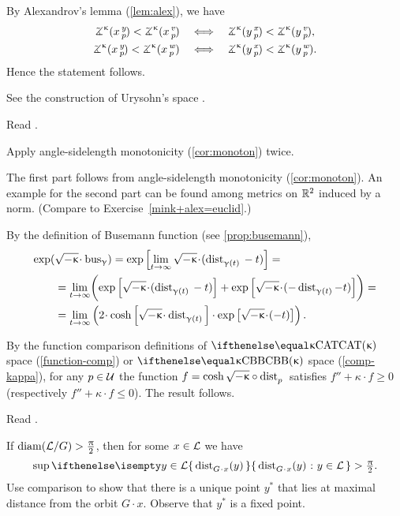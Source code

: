 By Alexandrov's lemma (\ref{lem:alex}), we have
\begin{align*}
\angk\kappa xyp<\angk\kappa xvp
\quad&\Longleftrightarrow\quad
\angk\kappa yxp<\angk\kappa yvp,
\\
\angk\kappa xyp<\angk\kappa xwp
\quad&\Longleftrightarrow\quad
\angk\kappa yxp<\angk\kappa ywp.
\end{align*}
Hence the statement follows.


 See the construction of Urysohn's space \cite[3.11$\tfrac{3}{2}_+$]{gromov-MS}.

Read \cite{lebedeva-petrunin}.

 Apply angle-sidelength  monotonicity (\ref{cor:monoton}) twice. 

 The first part follows from angle-sidelength  monotonicity (\ref{cor:monoton}).
An example for the second part can be found among metrics on $\mathbb{R}^2$ induced by a norm. (Compare to Exercise~\ref{mink+alex=euclid}.)

By the definition of Busemann function (see  \ref{prop:busemann}),
\begin{align*}
\exp(&\sqrt{-\kappa}\cdot\bus_\gamma) 
= \exp \left[\lim_{t\to \infty} \sqrt{-\kappa}\cdot(\distfun{{\gamma (t)}}{}{} - t)\right]=
\\
&= \lim_{t\to \infty} \biggl(\exp \left[\sqrt{-\kappa}\cdot(\distfun{\gamma (t)}{}{} -t)\right]
+\exp\left[\sqrt{-\kappa}\cdot(-\distfun{\gamma (t)}-t)\right]\biggr)=
\\
&=  \lim_{t\to \infty} \left(2\cdot \cosh \left[\sqrt{-\kappa}\cdot\distfun{\gamma (t)}{}{}\right]\cdot \exp\left[\sqrt{-\kappa}\cdot(-t)\right]\right).
\end{align*}

By the function comparison definitions of $\CAT\kappa$ space (\ref{function-comp}) or $\Alex{\kappa}$ space (\ref{comp-kappa}),  for any $p\in \spc{U}$ the function $f=\cosh \sqrt{-\kappa}\circ\distfun{p}{}{}$ satisfies $f''+\kappa \cdot f\ge 0$ (respectively  $f''+\kappa \cdot f\le 0$). The result follows.

 Read \cite{petrunin:globalization}.

 If $\mathop{\rm diam}\nolimits(\mathcal{L}/G)>\tfrac{\uppi}2$, then for some $x\in \spc{L}$ we have
\[\sup \set{\distfun{G\cdot x}(y)}{y\in \spc{L}}
>
\tfrac\pi2.\]
Use comparison to show that there is a unique point $y^{*}$ that lies at maximal distance from the orbit $G\cdot x$.
Observe that $y^{*}$ is a fixed point.

